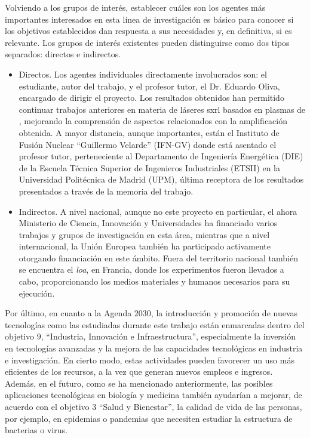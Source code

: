 Volviendo a los grupos de interés, establecer cuáles son los agentes más importantes interesados en esta línea de investigación es básico para conocer si los objetivos establecidos dan respuesta a sus necesidades y, en definitiva, si es relevante. Los grupos de interés existentes pueden distinguirse como dos tipos separados: directos e indirectos.

\begin{itemize}

    \item Directos. Los agentes individuales directamente involucrados son: el estudiante, autor del trabajo, y el profesor tutor, el Dr. Eduardo Oliva, encargado de dirigir el proyecto. Los resultados obtenidos han permitido continuar trabajos anteriores en materia de láseres \acrshort{sxrl} basados en plasmas de , mejorando la comprensión de aspectos relacionados con la amplificación obtenida. A mayor distancia, aunque importantes, están el Instituto de Fusión Nuclear \enquote{Guillermo Velarde} (IFN-GV) donde está asentado el profesor tutor, perteneciente al Departamento de Ingeniería Energética (DIE) de la Escuela Técnica Superior de Ingenieros Industriales (ETSII) en la Universidad Politécnica de Madrid (UPM), última receptora de los resultados presentados a través de la memoria del trabajo.
    \item Indirectos. A nivel nacional, aunque no este proyecto en particular, el ahora Ministerio de Ciencia, Innovación y Universidades ha financiado varios trabajos y grupos de investigación en esta área, mientras que a nivel internacional, la Unión Europea también ha participado activamente otorgando financiación en este ámbito. Fuera del territorio nacional también se encuentra el \emph{\acrfull{loa}}, en Francia, donde los experimentos fueron llevados a cabo, proporcionando los medios materiales y humanos necesarios para su ejecución.

\end{itemize}

Por último, en cuanto a la Agenda $2030$, la introducción y promoción de nuevas tecnologías como las estudiadas durante este trabajo están enmarcadas dentro del objetivo $9$, \enquote{Industria, Innovación e Infraestructura}, especialmente la inversión en tecnologías avanzadas y la mejora de las capacidades tecnológicas en industria e investigación. En cierto modo, estas actividades pueden favorecer un uso más eficientes de los recursos, a la vez que generan nuevos empleos e ingresos. Además, en el futuro, como se ha mencionado anteriormente, las posibles aplicaciones tecnológicas en biología y medicina también ayudarían a mejorar, de acuerdo con el objetivo $3$ \enquote{Salud y Bienestar}, la calidad de vida de las personas, por ejemplo, en epidemias o pandemias que necesiten estudiar la estructura de bacterias o virus.

